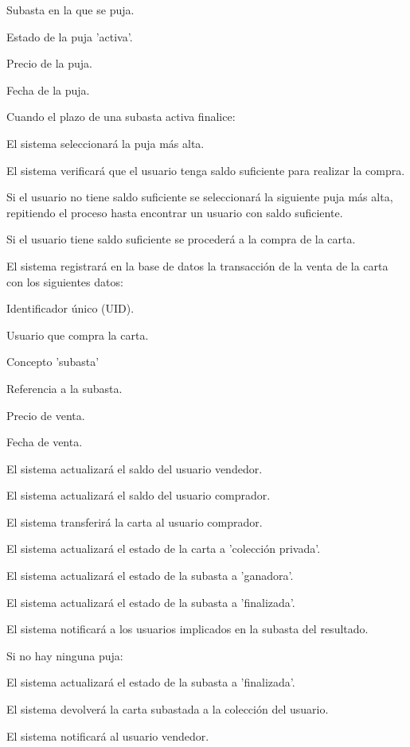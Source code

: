 \begin{RFSubastas}
\begin{RFSubastas}
\begin{RFSubastas}
			\item Subasta en la que se puja.
			\item Estado de la puja 'activa'.
			\item Precio de la puja.
			\item Fecha de la puja.
		\end{RFSubastas}
	\end{RFSubastas}
	\item Cuando el plazo de una subasta activa finalice:
	\begin{RFSubastas}
		\item El sistema seleccionará la puja más alta.
		\begin{RFSubastas}
			\item El sistema verificará que el usuario tenga saldo suficiente para realizar la compra.
			\item Si el usuario no tiene saldo suficiente se seleccionará la siguiente puja más alta, repitiendo el proceso hasta encontrar un usuario con saldo suficiente.
			\item Si el usuario tiene saldo suficiente se procederá a la compra de la carta.
			\item El sistema registrará en la base de datos la transacción de la venta de la carta con los siguientes datos:
			\begin{RFSubastas}
				\item Identificador único (UID).
				\item Usuario que compra la carta.
				\item Concepto 'subasta'
				\item Referencia a la subasta.
				\item Precio de venta.
				\item Fecha de venta.
			\end{RFSubastas}
			\item El sistema actualizará el saldo del usuario vendedor.
			\item El sistema actualizará el saldo del usuario comprador.
			\item El sistema transferirá la carta al usuario comprador.
			\item El sistema actualizará el estado de la carta a 'colección privada'.
			\item El sistema actualizará el estado de la subasta a 'ganadora'.
			\item El sistema actualizará el estado de la subasta a 'finalizada'.
			\item El sistema notificará a los usuarios implicados en la subasta del resultado.
		\end{RFSubastas}
		\item Si no hay ninguna puja:
		\begin{RFSubastas}
			\item El sistema actualizará el estado de la subasta a 'finalizada'.
			\item El sistema devolverá la carta subastada a la colección del usuario.
			\item El sistema notificará al usuario vendedor.
		\end{RFSubastas}
	

\end{RFSubastas}
\end{RFSubastas}
